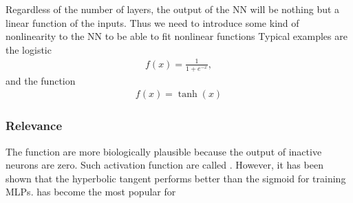 \documentclass[letterpaper,10pt,english]{sphinxmanual}
\begin{document}
Regardless of the number of layers, the output of the NN will be
nothing but a linear function of the inputs. Thus we need to introduce
some kind of non\sphinxhyphen{}linearity to the NN to be able to fit non\sphinxhyphen{}linear
functions Typical examples are the logistic 
\begin{equation*}
\begin{split}
f(x) = \frac{1}{1 + e^{-x}},
\end{split}
\end{equation*}
and the  function
\begin{equation*}
\begin{split}
f(x) = \tanh(x)
\end{split}
\end{equation*}

\subsubsection{Relevance}
\label{\detokenize{chapter6:relevance}}
The  function are more biologically plausible because the
output of inactive neurons are zero. Such activation function are
called . However, it has been shown that the hyperbolic
tangent performs better than the sigmoid for training MLPs.  has
become the most popular for 
\end{document}
